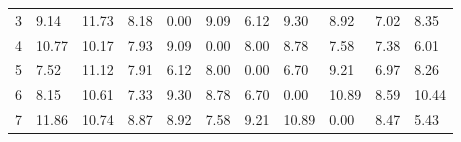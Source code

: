 \documentclass{article}
\begin{document}
\begin{table}[H]
\begin{tabular}{lllllllllll}
		\multicolumn{1}{l|}{3} & \multicolumn{1}{l|}{9.14}                         & \multicolumn{1}{l|}{11.73}                        & \multicolumn{1}{l|}{8.18}                         & \multicolumn{1}{l|}{\cellcolor[HTML]{C0C0C0}0.00} & \multicolumn{1}{l|}{9.09}                         & \multicolumn{1}{l|}{6.12}                         & \multicolumn{1}{l|}{9.30}                         & \multicolumn{1}{l|}{8.92}                         & \multicolumn{1}{l|}{7.02}                         & \multicolumn{1}{l|}{8.35}                         \\ \cline{2-11} 
		\multicolumn{1}{l|}{4} & \multicolumn{1}{l|}{10.77}                        & \multicolumn{1}{l|}{10.17}                        & \multicolumn{1}{l|}{7.93}                         & \multicolumn{1}{l|}{9.09}                         & \multicolumn{1}{l|}{\cellcolor[HTML]{C0C0C0}0.00} & \multicolumn{1}{l|}{8.00}                         & \multicolumn{1}{l|}{8.78}                         & \multicolumn{1}{l|}{7.58}                         & \multicolumn{1}{l|}{7.38}                         & \multicolumn{1}{l|}{6.01}                         \\ \cline{2-11} 
		\multicolumn{1}{l|}{5} & \multicolumn{1}{l|}{7.52}                         & \multicolumn{1}{l|}{11.12}                        & \multicolumn{1}{l|}{7.91}                         & \multicolumn{1}{l|}{6.12}                         & \multicolumn{1}{l|}{8.00}                         & \multicolumn{1}{l|}{\cellcolor[HTML]{C0C0C0}0.00} & \multicolumn{1}{l|}{6.70}                         & \multicolumn{1}{l|}{9.21}                         & \multicolumn{1}{l|}{6.97}                         & \multicolumn{1}{l|}{8.26}                         \\ \cline{2-11} 
		\multicolumn{1}{l|}{6} & \multicolumn{1}{l|}{8.15}                         & \multicolumn{1}{l|}{10.61}                        & \multicolumn{1}{l|}{7.33}                         & \multicolumn{1}{l|}{9.30}                         & \multicolumn{1}{l|}{8.78}                         & \multicolumn{1}{l|}{6.70}                         & \multicolumn{1}{l|}{\cellcolor[HTML]{C0C0C0}0.00} & \multicolumn{1}{l|}{10.89}                        & \multicolumn{1}{l|}{8.59}                         & \multicolumn{1}{l|}{10.44}                        \\ \cline{2-11} 
		\multicolumn{1}{l|}{7} & \multicolumn{1}{l|}{11.86}                        & \multicolumn{1}{l|}{10.74}                        & \multicolumn{1}{l|}{8.87}                         & \multicolumn{1}{l|}{8.92}                         & \multicolumn{1}{l|}{7.58}                         & \multicolumn{1}{l|}{9.21}                         & \multicolumn{1}{l|}{10.89}                        & \multicolumn{1}{l|}{\cellcolor[HTML]{C0C0C0}0.00} & \multicolumn{1}{l|}{8.47}                         & \multicolumn{1}{l|}{5.43}                         \\ \cline{2-11} 

\end{tabular}
\end{table}
\end{document}
